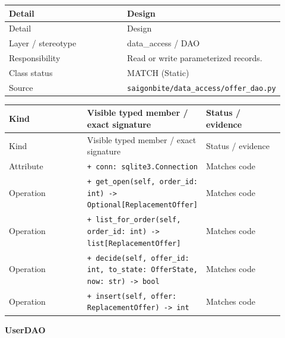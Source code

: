 \begin{longtable}{>{\raggedright\arraybackslash}p{0.4600\linewidth}>{\raggedright\arraybackslash}p{0.4600\linewidth}}
Detail & Design \\
\hline\endfirsthead
Detail & Design \\
\hline\endhead
Layer / stereotype & data\_access / \guillemotleft{}DAO\guillemotright{} \\
Responsibility & Read or write parameterized records. \\
Class status & MATCH (Static) \\
Source & \texttt{saigonbite/\allowbreak{}data\_\allowbreak{}access/\allowbreak{}offer\_\allowbreak{}dao.\allowbreak{}py} \\
\end{longtable}
\begin{longtable}{>{\raggedright\arraybackslash}p{0.3067\linewidth}>{\raggedright\arraybackslash}p{0.3067\linewidth}>{\raggedright\arraybackslash}p{0.3067\linewidth}}
Kind & Visible typed member / exact signature & Status / evidence \\
\hline\endfirsthead
Kind & Visible typed member / exact signature & Status / evidence \\
\hline\endhead
Attribute & \texttt{+ conn: sqlite3.\allowbreak{}Connection} & Matches code \\
Operation & \texttt{+ get\_\allowbreak{}open(self, order\_\allowbreak{}id: int) -\textgreater{} Optional[ReplacementOffer]} & Matches code \\
Operation & \texttt{+ list\_\allowbreak{}for\_\allowbreak{}order(self, order\_\allowbreak{}id: int) -\textgreater{} list[ReplacementOffer]} & Matches code \\
Operation & \texttt{+ decide(self, offer\_\allowbreak{}id: int, to\_\allowbreak{}state: OfferState, now: str) -\textgreater{} bool} & Matches code \\
Operation & \texttt{+ insert(self, offer: ReplacementOffer) -\textgreater{} int} & Matches code \\
\end{longtable}
\textbf{UserDAO}

